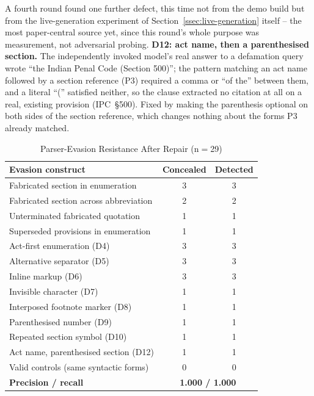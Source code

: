 \documentclass[conference]{IEEEtran}
\begin{document}
A fourth round found one further defect, this time not from the demo build
but from the live-generation experiment of
Section~\ref{ssec:live-generation} itself -- the most paper-central source
yet, since this round's whole purpose was measurement, not adversarial
probing. \textbf{D12: act name, then a parenthesised section.} The
independently invoked model's real answer to a defamation query wrote ``the
Indian Penal Code (Section 500)''; the pattern matching an act name followed
by a section reference (P3) required a comma or ``of the'' between them, and
a literal ``('' satisfied neither, so the clause extracted no citation at
all on a real, existing provision (IPC~\S500). Fixed by making the
parenthesis optional on both sides of the section reference, which changes
nothing about the forms P3 already matched.

\begin{table}[t]
\caption{Parser-Evasion Resistance After Repair (n$=$29)}
\label{tab:evasion}
\centering
\footnotesize
\begin{tabular}{@{}lcc@{}}
\toprule
\textbf{Evasion construct} & \textbf{Concealed} & \textbf{Detected} \\
\midrule
Fabricated section in enumeration      & 3 & 3 \\
Fabricated section across abbreviation & 2 & 2 \\
Unterminated fabricated quotation      & 1 & 1 \\
Superseded provisions in enumeration   & 1 & 1 \\
\addlinespace
Act-first enumeration (D4)             & 3 & 3 \\
Alternative separator (D5)             & 3 & 3 \\
Inline markup (D6)                     & 3 & 3 \\
Invisible character (D7)               & 1 & 1 \\
Interposed footnote marker (D8)        & 1 & 1 \\
Parenthesised number (D9)              & 1 & 1 \\
\addlinespace
Repeated section symbol (D10)          & 1 & 1 \\
\addlinespace
Act name, parenthesised section (D12)  & 1 & 1 \\
\addlinespace
Valid controls (same syntactic forms)  & 0 & 0 \\
\midrule
\textbf{Precision / recall} & \multicolumn{2}{c}{\textbf{1.000 / 1.000}} \\
\bottomrule
\end{tabular}
\end{table}
\end{document}
